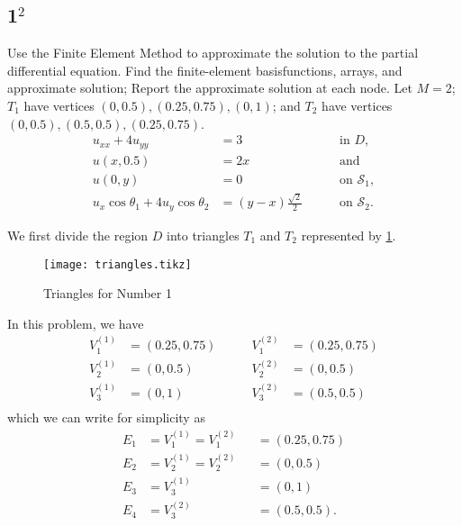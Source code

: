 \documentclass[12pt]{article}
\begin{document}
\subsection{1$^2$}
Use the Finite Element Method to approximate the solution to the partial
differential equation. Find the finite-element basisfunctions, arrays,
and approximate solution; Report the approximate solution at each
node. Let $M=2$; $T_1$ have vertices $(0,0.5), (0.25,0.75), (0,1)$; and
$T_2$ have vertices $(0,0.5), (0.5,0.5), (0.25,0.75)$.
\begin{equation}
  \label{eq:1_q}
  \begin{aligned}
    u_{xx}+4u_{yy} &= 3 &&\quad\text{ in } D, \\
    u(x,0.5) &= 2x
    &&\quad\text{ and } \\
    u(0,y) &= 0
    &&\quad\text{ on } \mathcal{S}_1, \\
    u_{x}\cos\theta_1 + 4u_{y}\cos\theta_2 &= (y-x)\frac{\sqrt{2}}{2}
    &&\quad\text{ on } \mathcal{S}_2.
  \end{aligned}
\end{equation}

%
%

We first divide the region $D$ into triangles $T_1$ and $T_2$
represented by \cref{fig:tri}.

\begin{figure}[H]
  \centering
  \texttt{[image: triangles.tikz]}
  \caption{Triangles for Number 1}
  \label{fig:tri}
\end{figure}
In this problem, we have 
\begin{equation}
  \label{eq:1_v}
  \begin{aligned}
    V_1^{(1)} &= (0.25,0.75) &\qquad V_1^{(2)} &= (0.25,0.75) \\
    V_2^{(1)} &= (0,0.5)     &\qquad V_2^{(2)} &= (0,0.5) \\
    V_3^{(1)} &= (0,1)       &\qquad V_3^{(2)} &= (0.5,0.5) \\
  \end{aligned}
\end{equation}
which we can write for simplicity as
\begin{equation}
  \label{eq:1_e}
  \begin{aligned}
    E_1 &= V_1^{(1)} = V_1^{(2)} &&= (0.25,0.75) \\
    E_2 &= V_2^{(1)} = V_2^{(2)} &&= (0,0.5) \\
    E_3 &= V_3^{(1)} &&= (0,1) \\
    E_4 &= V_3^{(2)} &&= (0.5,0.5). \\
  \end{aligned}
\end{equation}
\end{document}
